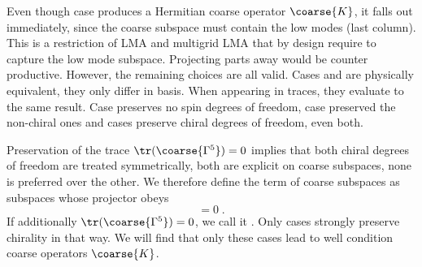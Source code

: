 Even though case  produces a Hermitian coarse operator $\coarse{K}$, it falls out immediately, since the coarse subspace must contain the low modes (last column).
This is a restriction of LMA and multigrid LMA that by design require to capture the low mode subspace.
Projecting parts away would be counter productive.
However, the remaining choices are all valid.
Cases  and  are physically equivalent, they only differ in basis.
When appearing in traces, they evaluate to the same result.
Case  preserves no spin degrees of freedom, case  preserved the non-chiral ones and cases  preserve chiral degrees of freedom,  even both.

Preservation of the trace $\tr(\coarse{\Gamma^5})=0$ implies that both chiral degrees of freedom are treated symmetrically, \ie both are explicit on coarse subspaces, none is preferred over the other.
We therefore define the term  of coarse subspaces as subspaces whose projector obeys
\begin{equation}
[P, \Gamma^{5}] = 0 \;.
\end{equation}
If additionally $\tr(\coarse{\Gamma^5}) = 0$, we call it .
Only cases  strongly preserve chirality in that way.
We will find that only these cases lead to well condition coarse operators $\coarse{K}$.


